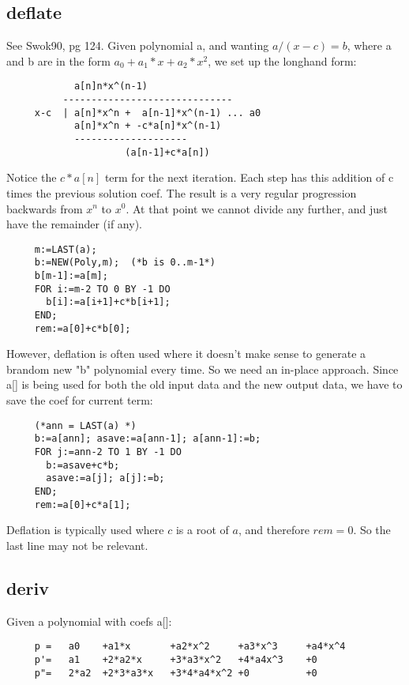 \subsection*{deflate}
See Swok90, pg 124.  Given polynomial a, and wanting $a/(x-c)
= b$, where a and b are in the form $a_0+a_1*x+a_2*x^2$, we set up
the longhand form:
\begin{verbatim}     
            a[n]n*x^(n-1)
          ------------------------------
     x-c  | a[n]*x^n +  a[n-1]*x^(n-1) ... a0
            a[n]*x^n + -c*a[n]*x^(n-1)
            --------------------
                     (a[n-1]+c*a[n])
\end{verbatim}
     
Notice the $c*a[n]$ term for the next iteration.  Each step
has this addition of c times the previous solution coef.
The result is a very regular progression backwards from $x^n$
to $x^0$.  At that point we cannot divide any further, and just
have the remainder (if any).
\begin{tt} \begin{verbatim}
     m:=LAST(a);
     b:=NEW(Poly,m);  (*b is 0..m-1*)
     b[m-1]:=a[m];
     FOR i:=m-2 TO 0 BY -1 DO
       b[i]:=a[i+1]+c*b[i+1];
     END;
     rem:=a[0]+c*b[0];
\end{verbatim} \end{tt}
     
However, deflation is often used where it doesn't make sense
to generate a brandom new "b" polynomial every time.  So we
need an in-place approach.  Since a[] is being used for both
the old input data and the new output data, we have to save
the coef for current term:
\begin{tt} \begin{verbatim}
     (*ann = LAST(a) *)
     b:=a[ann]; asave:=a[ann-1]; a[ann-1]:=b;
     FOR j:=ann-2 TO 1 BY -1 DO
       b:=asave+c*b;
       asave:=a[j]; a[j]:=b;
     END;
     rem:=a[0]+c*a[1];
\end{verbatim} \end{tt}

Deflation is typically used where $c$ is a root of $a$, and
therefore $rem=0$.  So the last line may not be relevant.

\subsection*{deriv}
Given a polynomial with coefs a[]:
\begin{verbatim}
     p =   a0    +a1*x       +a2*x^2     +a3*x^3     +a4*x^4
     p'=   a1    +2*a2*x     +3*a3*x^2   +4*a4x^3    +0
     p"=   2*a2  +2*3*a3*x   +3*4*a4*x^2 +0          +0
\end{verbatim}

